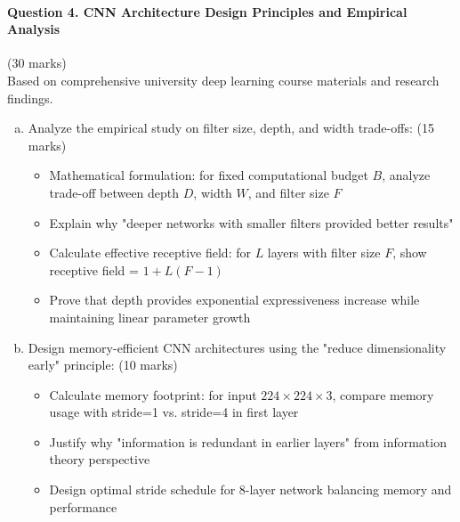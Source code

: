 \documentclass[12pt]{article}
\newcommand{\shortanswer}{\vspace{2cm}}
\begin{document}
\newpage
\paragraph{Question 4. CNN Architecture Design Principles and Empirical Analysis}{{\hfill (30 marks)}}\\
Based on comprehensive university deep learning course materials and research findings.

\begin{enumerate}[(a)]
    \item Analyze the empirical study on filter size, depth, and width trade-offs: \hfill (15 marks)
    \begin{itemize}
        \item Mathematical formulation: for fixed computational budget $B$, analyze trade-off between depth $D$, width $W$, and filter size $F$
        \item Explain why "deeper networks with smaller filters provided better results"
        \item Calculate effective receptive field: for $L$ layers with filter size $F$, show receptive field = $1 + L(F-1)$
        \item Prove that depth provides exponential expressiveness increase while maintaining linear parameter growth
    \end{itemize}
    
    \begin{center}
    \end{center}
    
    \shortanswer
    
    \item Design memory-efficient CNN architectures using the "reduce dimensionality early" principle: \hfill (10 marks)
    \begin{itemize}
        \item Calculate memory footprint: for input $224 \times 224 \times 3$, compare memory usage with stride=1 vs. stride=4 in first layer
        \item Justify why "information is redundant in earlier layers" from information theory perspective
        \item Design optimal stride schedule for 8-layer network balancing memory and performance
    \end{itemize}
    

\end{enumerate}
\end{document}
